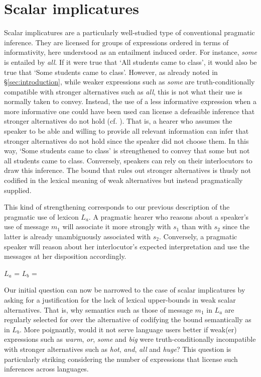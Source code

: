 \documentclass[a4paper]{article}
\begin{document}
\section{Scalar implicatures}\label{sec:si-case-study}
%
Scalar implicatures are a particularly well-studied type of conventional pragmatic inference. They are licensed for groups of expressions ordered in terms of informativity, here understood as an entailment induced order. For instance, {\em some} is entailed by {\em all}. If it were true that `All students came to class', it would also be true that `Some students came to class'. However, as already noted in \S\ref{sec:introduction}, while weaker expressions such as {\em some} are truth-conditionally compatible with stronger alternatives such as {\em all}, this is not what their use is normally taken to convey. Instead, the use of a less informative expression when a more informative one could have been used can license a defeasible inference that stronger alternatives do not hold (cf. \citealt{horn:1972,gazdar:1979}). That is, a hearer who assumes the speaker to be able and willing to provide all relevant information can infer that stronger alternatives do not hold since the speaker did not choose them. In this way, `Some students came to class' is strengthened to convey that some but not all students came to class. Conversely, speakers can rely on their interlocutors to draw this inference. The bound that rules out stronger alternatives is thusly not codified in the lexical meaning of weak alternatives but instead pragmatically supplied.

This kind of strengthening corresponds to our previous description of the pragmatic use of lexicon $L_a$. A pragmatic hearer who reasons about a speaker's use of message $m_1$ will associate it more strongly with $s_1$ than with $s_2$ since the latter is already unambiguously associated with $s_2$. Conversely, a pragmatic speaker will reason about her interlocutor's expected interpretation and use the messages at her disposition accordingly. 

\begin{centering}
$L_a$ =  \hspace{2cm} $L_b$ = \\[0.5cm]
\end{centering}

Our initial question can now be narrowed to the case of scalar implicatures by asking for a justification for the lack of lexical upper-bounds in weak scalar alternatives. That is, why semantics such as those of message $m_1$ in $L_a$ are regularly selected for over the alternative of codifying the bound semantically as in $L_b$. More poignantly, would it not serve language users better if weak(er) expressions such as {\em warm}, {\em or}, {\em some} and {\em big} were truth-conditionally incompatible with stronger alternatives such as {\em hot}, {\em and}, {\em all} and {\em huge}?  This question is particularly striking considering the number of expressions that license such inferences across languages. 
\end{document}
